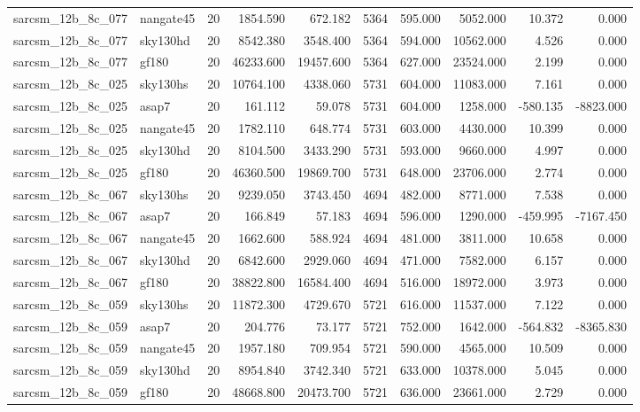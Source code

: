 \begin{longtable}{llrrrrrrrr}
sarcsm\_12b\_8c\_077 & nangate45 & 20 & 1854.590 & 672.182 & 5364 & 595.000 & 5052.000 & 10.372 & 0.000 \\
sarcsm\_12b\_8c\_077 & sky130hd & 20 & 8542.380 & 3548.400 & 5364 & 594.000 & 10562.000 & 4.526 & 0.000 \\
sarcsm\_12b\_8c\_077 & gf180 & 20 & 46233.600 & 19457.600 & 5364 & 627.000 & 23524.000 & 2.199 & 0.000 \\
sarcsm\_12b\_8c\_025 & sky130hs & 20 & 10764.100 & 4338.060 & 5731 & 604.000 & 11083.000 & 7.161 & 0.000 \\
sarcsm\_12b\_8c\_025 & asap7 & 20 & 161.112 & 59.078 & 5731 & 604.000 & 1258.000 & -580.135 & -8823.000 \\
sarcsm\_12b\_8c\_025 & nangate45 & 20 & 1782.110 & 648.774 & 5731 & 603.000 & 4430.000 & 10.399 & 0.000 \\
sarcsm\_12b\_8c\_025 & sky130hd & 20 & 8104.500 & 3433.290 & 5731 & 593.000 & 9660.000 & 4.997 & 0.000 \\
sarcsm\_12b\_8c\_025 & gf180 & 20 & 46360.500 & 19869.700 & 5731 & 648.000 & 23706.000 & 2.774 & 0.000 \\
sarcsm\_12b\_8c\_067 & sky130hs & 20 & 9239.050 & 3743.450 & 4694 & 482.000 & 8771.000 & 7.538 & 0.000 \\
sarcsm\_12b\_8c\_067 & asap7 & 20 & 166.849 & 57.183 & 4694 & 596.000 & 1290.000 & -459.995 & -7167.450 \\
sarcsm\_12b\_8c\_067 & nangate45 & 20 & 1662.600 & 588.924 & 4694 & 481.000 & 3811.000 & 10.658 & 0.000 \\
sarcsm\_12b\_8c\_067 & sky130hd & 20 & 6842.600 & 2929.060 & 4694 & 471.000 & 7582.000 & 6.157 & 0.000 \\
sarcsm\_12b\_8c\_067 & gf180 & 20 & 38822.800 & 16584.400 & 4694 & 516.000 & 18972.000 & 3.973 & 0.000 \\
sarcsm\_12b\_8c\_059 & sky130hs & 20 & 11872.300 & 4729.670 & 5721 & 616.000 & 11537.000 & 7.122 & 0.000 \\
sarcsm\_12b\_8c\_059 & asap7 & 20 & 204.776 & 73.177 & 5721 & 752.000 & 1642.000 & -564.832 & -8365.830 \\
sarcsm\_12b\_8c\_059 & nangate45 & 20 & 1957.180 & 709.954 & 5721 & 590.000 & 4565.000 & 10.509 & 0.000 \\
sarcsm\_12b\_8c\_059 & sky130hd & 20 & 8954.840 & 3742.340 & 5721 & 633.000 & 10378.000 & 5.045 & 0.000 \\
sarcsm\_12b\_8c\_059 & gf180 & 20 & 48668.800 & 20473.700 & 5721 & 636.000 & 23661.000 & 2.729 & 0.000 \\

\end{longtable}
